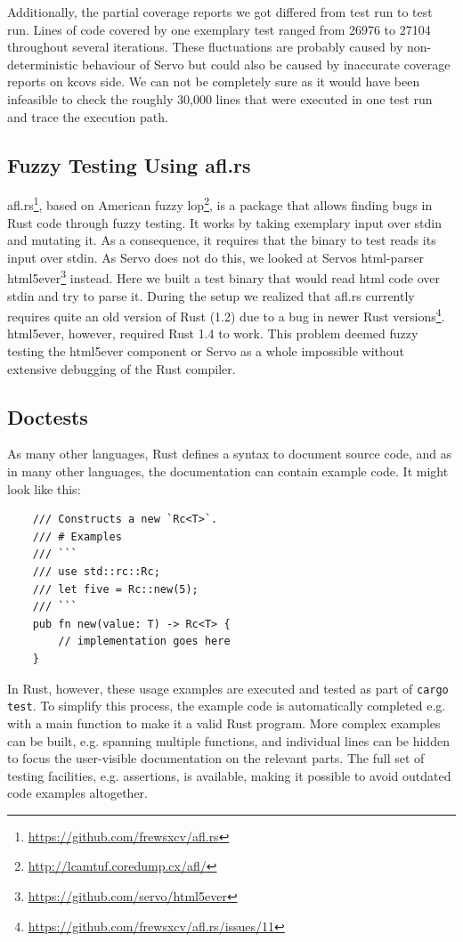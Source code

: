 \documentclass{scrartcl}
\begin{document}
Additionally, the partial coverage reports we got differed from test run to test run. Lines of code covered by one exemplary test ranged from 26976 to 27104 throughout several iterations. These fluctuations are probably caused by non-deterministic behaviour of Servo but could also be caused by inaccurate coverage reports on kcovs side. We can not be completely sure as it would have been infeasible to check the roughly 30,000 lines that were executed in one test run and trace the execution path.


\subsection{Fuzzy Testing Using afl.rs}

afl.rs\footnote{\url{https://github.com/frewsxcv/afl.rs}}, based on American fuzzy lop\footnote{\url{http://lcamtuf.coredump.cx/afl/}}, is a package that allows finding bugs in Rust code through fuzzy testing. It works by taking exemplary input over stdin and mutating it. As a consequence, it requires that the binary to test reads its input over stdin. As Servo does not do this, we looked at Servos html-parser html5ever\footnote{\url{https://github.com/servo/html5ever}} instead. Here we built a test binary that would read html code over stdin and try to parse it. During the setup we realized that afl.rs currently requires quite an old version of Rust (1.2) due to a bug in newer Rust versions\footnote{\url{https://github.com/frewsxcv/afl.rs/issues/11}}. html5ever, however, required Rust 1.4 to work. This problem deemed fuzzy testing the html5ever component or Servo as a whole impossible without extensive debugging of the Rust compiler.


\subsection{Doctests}

As many other languages, Rust defines a syntax to document source code, and as in many other languages, the documentation can contain example code. It might look like this:

\small {
    \begin{verbatim}
    /// Constructs a new `Rc<T>`.
    /// # Examples
    /// ```
    /// use std::rc::Rc;
    /// let five = Rc::new(5);
    /// ```
    pub fn new(value: T) -> Rc<T> {
        // implementation goes here
    }
    \end{verbatim}
}

In Rust, however, these usage examples are executed and tested as part of \texttt{cargo test}. To simplify this process, the example code is automatically completed e.g. with a main function to make it a valid Rust program. More complex examples can be built, e.g. spanning multiple functions, and individual lines can be hidden to focus the user-visible documentation on the relevant parts. The full set of testing facilities, e.g. assertions, is available, making it possible to avoid outdated code examples altogether.
\end{document}
